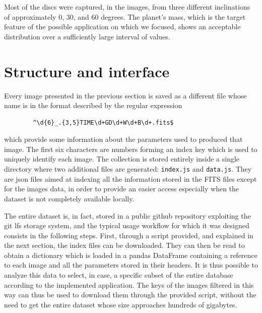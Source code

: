 \documentclass[a4paper,10pt]{report}
\begin{document}
Most of the discs were captured, in the images, from three different inclinations of approximately
0, 30, and 60 degrees. The planet's mass, which is the target feature of the possible application on which we focused, shows an acceptable distribution over
a sufficiently large interval of values.

\section{Structure and interface}

Every image presented in the previous section is saved as a different file whose name is in the format 
described by the regular expression 
\begin{center}
    \begin{lstlisting}
        ^\d{6}_.{3,5}TIME\d+GD\d+W\d+B\d+.fits$
    \end{lstlisting}
\end{center}
which provide some information about the parameters used to produced that image. The first six 
characters are numbers forming an index key which is used to uniquely identify each image.
The collection is stored entirely inside a single directory where two additional files are generated: 
\lstinline{index.js} and \lstinline{data.js}. They are json files aimed at indexing all the information stored in the FITS 
files except for the images data, in order to provide an easier access especially when the dataset is not completely
available locally.

The entire dataset is, in fact, stored in a public github repository exploiting
the git lfs storage system, and the typical usage workflow for which it was designed 
consists in the following steps. First, through a script provided, and explained in the next section,
the index files can be downloaded. They can then be read to obtain a dictionary which is loaded in a pandas DataFrame containing
a reference to each image and all the parameters stored in their headers. 
It is thus possible to analyze this data to select, in case, a specific subset of the entire database
according to the implemented application.
The keys of the images filtered in this way can thus be used to download them through the provided script, without the need
to get the entire dataset whose size approaches hundreds of gigabytes.
\end{document}
